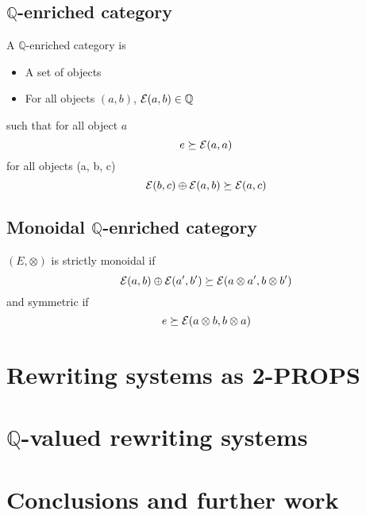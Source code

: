 \documentclass[a4paper]{article}
\begin{document}
\subsection{$\mathbb{Q}$-enriched category}

A $\mathbb{Q}$-enriched category \catE is

\begin{itemize}
\item A set of objects
\item For all objects $(a, b)$, ${\cal E}(a, b) \in \mathbb{Q}$
\end{itemize}

such that for all object $a$
$$
e \succeq {\cal E}(a, a)
$$
for all objects (a, b, c)
$$
{\cal E}(b, c) \oplus {\cal E}(a, b) \succeq {\cal E}(a, c)
$$

\subsection{Monoidal $\mathbb{Q}$-enriched category}

$(E, \otimes)$ is strictly monoidal if
$$
{\cal E}(a, b) \oplus {\cal E}(a', b') \succeq {\cal E}(a \otimes a', b \otimes b')
$$
and symmetric if
$$
e \succeq {\cal E}(a \otimes b, b \otimes a)
$$

\section{Rewriting systems as 2-PROPS}
\label{sec:rewriting}

\section{$\mathbb{Q}$-valued rewriting systems}

\section{Conclusions and further work}
\label{sec:conclusion}



\small

\end{document}
